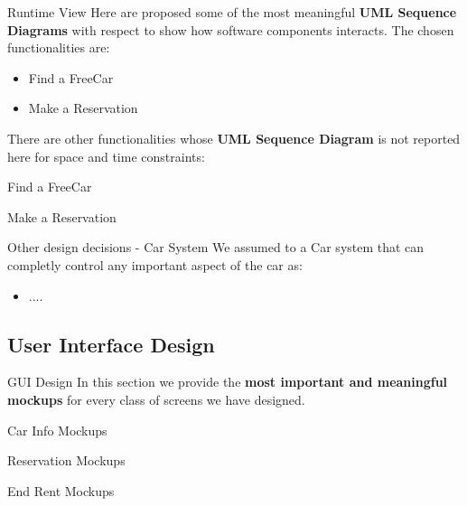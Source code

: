 \documentclass{../Common/Structure/pdf_presentation}
\begin{document}
	\begin{frame}{Runtime View}
		Here are proposed some of the most meaningful \textbf{UML Sequence Diagrams} with respect to show how software components interacts.
		The chosen functionalities are:
		\begin{itemize}
			\item Find a FreeCar
			\item Make a Reservation
		\end{itemize}
		There are other functionalities whose \textbf{UML Sequence Diagram} is not reported here for space and time constraints:
	\end{frame}
	\begin{frame}{Find a FreeCar}
	\end{frame}
	\begin{frame}{Make a Reservation}
	\end{frame}
	\begin{frame}{Other design decisions - Car System}
		We assumed to a Car system that can completly control any important aspect of the car as:
		\begin{itemize}
			\item ....
		\end{itemize}
	\end{frame}

	\subsection{User Interface Design}
	\begin{frame}{GUI Design}
		In this section we provide the \textbf{most important and meaningful mockups} for every class of screens we have designed.
	\end{frame}
	\begin{frame}{Car Info Mockups}
	\end{frame}
	\begin{frame}{Reservation Mockups}
	\end{frame}
	\begin{frame}{End Rent Mockups}
	\end{frame}
\end{document}
